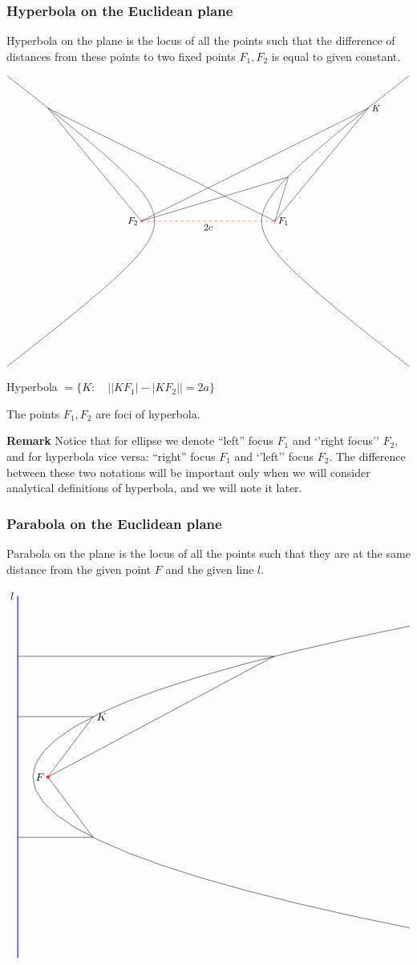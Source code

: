 \documentclass[12pt]{article}
\numberwithin{equation}{section}
\begin{document}
 \subsubsection {Hyperbola on the  Euclidean plane}

 Hyperbola on the plane is the locus of all the points
such that the difference of distances from these points to
two fixed points $F_1,F_2$ is equal to given constant.



\begin{equation}\label{firsthyperbola}
\begin{tikzpicture}[scale=0.5]
    \pgfmathsetmacro{\a}{4}
    \pgfmathsetmacro{\b}{3}
    \draw [domain=-2:2] plot ({\a*cosh(\x)},{\b*sinh(\x)});
   \draw plot[domain=-2:2] ({-\a*cosh(\x)},{\b*sinh(\x)});
\draw  (-5,0)--(12,8.46)--(5,0);
\draw  (-5,0)--(-12,8.46)--(5,0);
\draw  (-5,0)--(6,3.3)--(5,0);
\node [right] at (12, 8.46) {$K$};
\draw [dashed, red] (-5,0) -- (5,0);
\node [below] at (0,0) {$2c$};

\draw[red,thick] (-5,0) circle (1pt); 
\draw[red,thick] (5,0) circle (1pt); 
\node [left] at (-5,0) {$F_2$};
\node [right] at (5,0) {$F_1$};
\end{tikzpicture}
\end{equation}


Hyperbola $=\{K\colon\quad \left||KF_1|-|KF_2|\right|=2a\}$

The points $F_1,F_2$ are foci of hyperbola.
 
{\bf Remark} Notice that for ellipse
we denote 
``left'' focus $F_1$ and `'right focus''
$F_2$, and for hyperbola vice versa:
``right'' focus $F_1$ and `'left''  focus
$F_2$. The difference between these two notations
will be important only
when we will consider analytical definitions of
hyperbola, and we will note it later.

 \subsubsection {Parabola  on the  Euclidean plane}

 Parabola on the plane is the locus of all the points
such that they are at the same distance from the given point
   $F$ and the given line $l$.


\begin{equation}\label{firstparabola}
\begin{tikzpicture}%
    \draw [domain=-5:5] plot ({0.5*\x*\x-5},\x);
\draw [  thick, blue] (-5.5,-6)--(-5.5,6); 
\node [left] at (-5.5,6) {$l$};
\draw  (-5.5,4)--(3,4)--(-4.5,0);
\draw  (-5.5,-2)--(-3,-2)--(-4.5,0);
\draw  (-5.5,2)--(-3,2)--(-4.5,0);
\node [right] at (-3, 2) {$K$};
\draw[red,thick] (-4.5,0) circle (1pt); 
\node [left] at (-4.5,0) {$F$};
\end{tikzpicture}
\end{equation}
\end{document}

